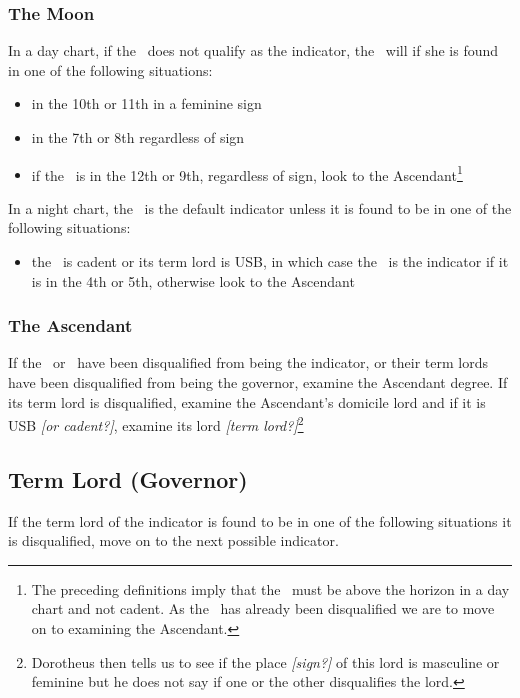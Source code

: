\subsubsection{The Moon}
\vspace{-0.5em}
In a day chart, if the \Sun\, does not qualify as the indicator, the \Moon\, will if she is found in one of the following situations:
\begin{itemize}[topsep=0em,itemsep=0em]
\item {}in the 10th or 11th in a feminine sign
\item {}in the 7th or 8th regardless of sign
\item if the \Moon\, is in the 12th or 9th, regardless of sign, look to the Ascendant\footnote{The preceding definitions imply that the \Moon\, must be above the horizon in a day chart and not cadent. As the \Sun\, has already been disqualified we are to move on to examining the Ascendant.}
\end{itemize}

In a night chart, the \Moon\, is the default indicator unless it is found to be in one of the following situations:
\begin{itemize}[topsep=0em,itemsep=0em]
\item {}the \Moon\, is cadent or its term lord is USB, in which case the \Sun\, is the indicator if it is in the 4th or 5th, otherwise look to the Ascendant
\end{itemize}

\subsubsection{The Ascendant}
If the \Sun\, or \Moon\, have been disqualified from being the indicator, or their term lords have been disqualified from being the governor, examine the Ascendant degree. If its term lord is disqualified, examine the Ascendant's domicile lord and  if it is USB \textsl{[or cadent?]}, examine its lord \textsl{[term lord?]}\footnote{Dorotheus then tells us to see if the place \textsl{[sign?]} of this lord is masculine or feminine but he does not say if one or the other disqualifies the lord.}

\vspace{-0.5em}
\subsection{Term Lord (Governor)}
If the term lord of the indicator is found to be in one of the following situations  it is disqualified, move on to the next possible indicator.

